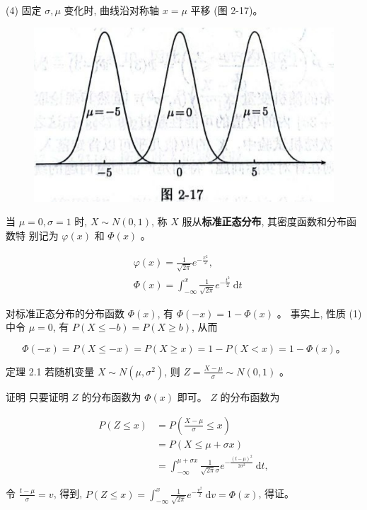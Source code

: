 \documentclass{beamer}
\begin{document}
	\begin{frame}
		(4) 固定 $\sigma, \mu$ 变化时, 曲线沿对称轴 $x=\mu$ 平移 (图 2-17)。
		\begin{figure}
			\centering
			\includegraphics[scale = 0.3]{figures/figure2-17}
		\end{figure}
	\end{frame}
	
	\begin{frame}
		当 $\mu=0, \sigma=1$ 时, $X \sim N(0,1)$, 称 $X$ 服从\textbf{标准正态分布}, 其密度函数和分布函数特 别记为 $\varphi(x)$ 和 $\Phi(x)$ 。
		
		$$
		\begin{aligned}
			& \varphi(x)=\frac{1}{\sqrt{2 \pi}} e^{-\frac{x^{2}}{2}}, \\
			& \Phi(x)=\int_{-\infty}^{x} \frac{1}{\sqrt{2 \pi}} e^{-\frac{t^{2}}{2}} \mathrm{~d} t
		\end{aligned}
		$$
		
		对标准正态分布的分布函数 $\Phi(x)$, 有 $\Phi(-x)=1-\Phi(x)$ 。 事实上, 性质 (1) 中令 $\mu=0$, 有 $P(X \leqslant-b)=P(X \geqslant b)$, 从而
		
		$$
		\Phi(-x)=P(X \leqslant-x)=P(X \geqslant x)=1-P(X<x)=1-\Phi(x) 。
		$$
	\end{frame}
	
	\begin{frame}
		定理 2.1 若随机变量 $X \sim N\left(\mu, \sigma^{2}\right)$, 则 $Z=\frac{X-\mu}{\sigma} \sim N(0,1)$ 。
		
		证明 只要证明 $Z$ 的分布函数为 $\Phi(x)$ 即可。 $Z$ 的分布函数为
		
		\begin{align}
				P(Z \leqslant x)&=P\left(\frac{X-\mu}{\sigma} \leqslant x\right) \\
				&=P(X \leqslant \mu+\sigma x) \\
				&=\int_{-\infty}^{\mu+\sigma x} \frac{1}{\sqrt{2 \pi} \sigma} e^{-\frac{(t-\mu)^{2}}{2 \sigma^{2}}} \mathrm{~d} t,
		\end{align}
		
		令 $\frac{t-\mu}{\sigma}=v$, 得到, $P(Z \leqslant x)=\int_{-\infty}^{x} \frac{1}{\sqrt{2 \pi}} e^{-\frac{v^{2}}{2}} \mathrm{~d} v=\Phi(x)$, 得证。
	\end{frame}
	
\end{document}
